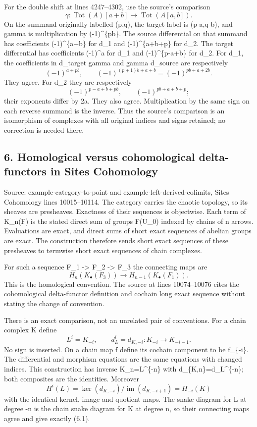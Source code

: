 \documentclass[11pt]{article}
\begin{document}
For the double shift at lines 4247--4302, use the source's comparison \[
\gamma:\operatorname{Tot}(A)[a+b]
\longrightarrow \operatorname{Tot}(A[a,b]).
\] On the summand originally labelled (p,q), the target label is (p-a,q-b), and gamma is multiplication by (-1)\^{}\{pb\}. The source differential on that summand has coefficients (-1)\^{}\{a+b\} for d\_1 and (-1)\^{}\{a+b+p\} for d\_2. The target differential has coefficients (-1)\^{}a for d\_1 and (-1)\^{}\{p-a+b\} for d\_2. For d\_1, the coefficients in d\_target gamma and gamma d\_source are respectively \[
(-1)^{a+pb},\qquad
(-1)^{(p+1)b+a+b}=(-1)^{pb+a+2b}.
\] They agree. For d\_2 they are respectively \[
(-1)^{p-a+b+pb},\qquad
(-1)^{pb+a+b+p};
\] their exponents differ by 2a. They also agree. Multiplication by the same sign on each reverse summand is the inverse. Thus the source's comparison is an isomorphism of complexes with all original indices and signs retained; no correction is needed there.

\subsection{6. Homological versus cohomological delta-functors in Sites Cohomology}\label{note-03-homological-versus-cohomological-delta-functors-in-sites-cohomology}

Source: example-category-to-point and example-left-derived-colimits, Sites Cohomology lines 10015--10114. The category carries the chaotic topology, so its sheaves are presheaves. Exactness of their sequences is objectwise. Each term of K\_n(F) is the stated direct sum of groups F(U\_0) indexed by chains of n arrows. Evaluations are exact, and direct sums of short exact sequences of abelian groups are exact. The construction therefore sends short exact sequences of these presheaves to termwise short exact sequences of chain complexes.

For such a sequence F\_1 -\textgreater{} F\_2 -\textgreater{} F\_3 the connecting maps are \[
H_n(K_\bullet(F_3))\longrightarrow H_{n-1}(K_\bullet(F_1)).
                                                               \tag{6.1}
\] This is the homological convention. The source at lines 10074--10076 cites the cohomological delta-functor definition and cochain long exact sequence without stating the change of convention.

There is an exact comparison, not an unrelated pair of conventions. For a chain complex K define \[
L^i=K_{-i},\qquad d_L^i=d_{K,-i}:K_{-i}\longrightarrow K_{-i-1}.
\] No sign is inserted. On a chain map f define its cochain component to be f\_\{-i\}. The differential and morphism equations are the same equations with changed indices. This construction has inverse K\_n=L\^{}\{-n\} with d\_\{K,n\}=d\_L\^{}\{-n\}; both composites are the identities. Moreover \[
H^i(L)=
\ker(d_{K,-i})/\operatorname{im}(d_{K,-i+1})
=H_{-i}(K)
\] with the identical kernel, image and quotient maps. The snake diagram for L at degree -n is the chain snake diagram for K at degree n, so their connecting maps agree and give exactly (6.1).
\end{document}
